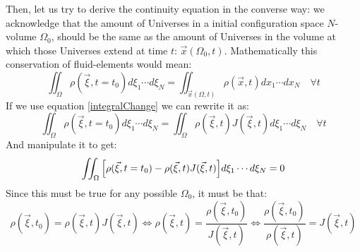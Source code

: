 \documentclass[11pt, a4paper]{article} %
\begin{document}
{Then, let us try to derive the continuity equation in the converse way: we acknowledge that the amount of Universes in a initial configuration space $N$-volume $\Omega_0$, should be the same as the amount of Universes in the volume at which those Universes extend at time $t$: $\vec{x}(\Omega_0,t)$. Mathematically this conservation of fluid-elements would mean:
\begin{equation}
\iint_\Omega \rho(\vec{\xi},t=t_0) d\xi_1\cdots d\xi_N=\iint_{\vec{x}(\Omega,t)} \rho(\vec{x},t) dx_1\cdots dx_N\quad \forall t
\end{equation}
If we use equation \eqref{integralChange} we can rewrite it as:
\begin{equation}
\iint_\Omega \rho(\vec{\xi},t=t_0) d\xi_1\cdots d\xi_N=\iint_{\Omega} \rho(\vec{\xi},t) J(\vec{\xi},t) d\xi_1\cdots d\xi_N \quad \forall t
\end{equation}
And manipulate it to get:
\begin{equation}
\iint_\Omega \qty[ \rho(\vec{\xi},t=t_0) -\rho(\vec{\xi},t) J(\vec{\xi},t) ]d\xi_1\cdots d\xi_N=0
\end{equation}
Since this must be true for any possible $\Omega_0$, it must be that:
\begin{equation}
\rho(\vec{\xi},t_0) = \rho(\vec{\xi},t) J(\vec{\xi},t)\Longleftrightarrow \rho(\vec{\xi},t)=\frac{\rho(\vec{\xi},t_0)}{J(\vec{\xi},t)}\Longleftrightarrow \frac{\rho(\vec{\xi},t_0)}{\rho(\vec{\xi},t)}=J(\vec{\xi},t)
\end{equation}
}
\end{document}
